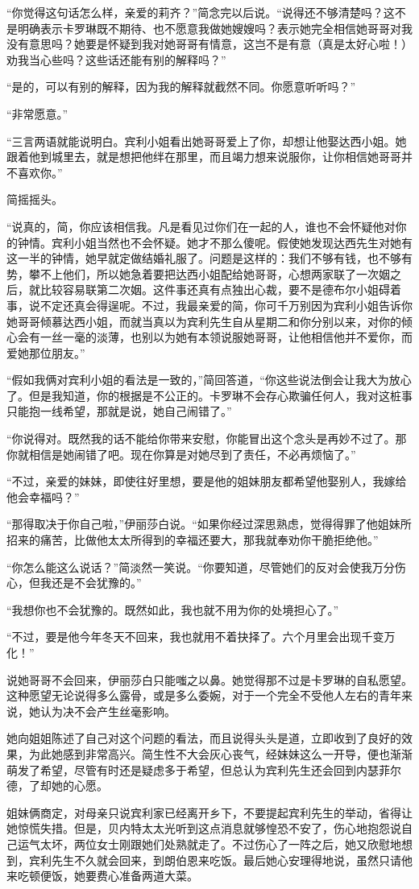 \par “你觉得这句话怎么样，亲爱的莉齐？”简念完以后说。“说得还不够清楚吗？这不是明确表示卡罗琳既不期待、也不愿意我做她嫂嫂吗？表示她完全相信她哥哥对我没有意思吗？她要是怀疑到我对她哥哥有情意，这岂不是有意（真是太好心啦！）劝我当心些吗？这些话还能有别的解释吗？”
\par “是的，可以有别的解释，因为我的解释就截然不同。你愿意听听吗？”
\par “非常愿意。”
\par “三言两语就能说明白。宾利小姐看出她哥哥爱上了你，却想让他娶达西小姐。她跟着他到城里去，就是想把他绊在那里，而且竭力想来说服你，让你相信她哥哥并不喜欢你。”
\par 简摇摇头。
\par “说真的，简，你应该相信我。凡是看见过你们在一起的人，谁也不会怀疑他对你的钟情。宾利小姐当然也不会怀疑。她才不那么傻呢。假使她发现达西先生对她有这一半的钟情，她早就定做结婚礼服了。问题是这样的：我们不够有钱，也不够有势，攀不上他们，所以她急着要把达西小姐配给她哥哥，心想两家联了一次姻之后，就比较容易联第二次姻。这件事还真有点独出心裁，要不是德布尔小姐碍着事，说不定还真会得逞呢。不过，我最亲爱的简，你可千万别因为宾利小姐告诉你她哥哥倾慕达西小姐，而就当真以为宾利先生自从星期二和你分别以来，对你的倾心会有一丝一毫的淡薄，也别以为她有本领说服她哥哥，让他相信他并不爱你，而爱她那位朋友。”
\par “假如我俩对宾利小姐的看法是一致的，”简回答道，“你这些说法倒会让我大为放心了。但是我知道，你的根据是不公正的。卡罗琳不会存心欺骗任何人，我对这桩事只能抱一线希望，那就是说，她自己闹错了。”
\par “你说得对。既然我的话不能给你带来安慰，你能冒出这个念头是再妙不过了。那你就相信是她闹错了吧。现在你算是对她尽到了责任，不必再烦恼了。”
\par “不过，亲爱的妹妹，即使往好里想，要是他的姐妹朋友都希望他娶别人，我嫁给他会幸福吗？”
\par “那得取决于你自己啦，”伊丽莎白说。“如果你经过深思熟虑，觉得得罪了他姐妹所招来的痛苦，比做他太太所得到的幸福还要大，那我就奉劝你干脆拒绝他。”
\par “你怎么能这么说话？”简淡然一笑说。“你要知道，尽管她们的反对会使我万分伤心，但我还是不会犹豫的。”
\par “我想你也不会犹豫的。既然如此，我也就不用为你的处境担心了。”
\par “不过，要是他今年冬天不回来，我也就用不着抉择了。六个月里会出现千变万化！”
\par 说她哥哥不会回来，伊丽莎白只能嗤之以鼻。她觉得那不过是卡罗琳的自私愿望。这种愿望无论说得多么露骨，或是多么委婉，对于一个完全不受他人左右的青年来说，她认为决不会产生丝毫影响。
\par 她向姐姐陈述了自己对这个问题的看法，而且说得头头是道，立即收到了良好的效果，为此她感到非常高兴。简生性不大会灰心丧气，经妹妹这么一开导，便也渐渐萌发了希望，尽管有时还是疑虑多于希望，但总认为宾利先生还会回到内瑟菲尔德，了却她的心愿。
\par 姐妹俩商定，对母亲只说宾利家已经离开乡下，不要提起宾利先生的举动，省得让她惊慌失措。但是，贝内特太太光听到这点消息就够惶恐不安了，伤心地抱怨说自己运气太坏，两位女士刚跟她们处熟就走了。不过伤心了一阵之后，她又欣慰地想到，宾利先生不久就会回来，到朗伯恩来吃饭。最后她心安理得地说，虽然只请他来吃顿便饭，她要费心准备两道大菜。



